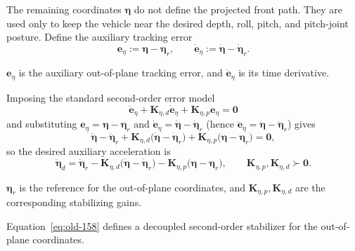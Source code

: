 \documentclass[12pt,a4paper]{report}
\newcommand{\newsymbols}[1]{\par\noindent{}#1\par\vspace{0.35em}}
\newcommand{\formulaannotation}[1]{\par\noindent{}#1\par\vspace{0.35em}}
\begin{document}
The remaining coordinates $\boldsymbol{\eta}$ do not define the projected front path. They are used only to keep the vehicle near the desired depth, roll, pitch, and pitch-joint posture. Define the auxiliary tracking error
\begin{equation}
\mathbf{e}_{\eta} := \boldsymbol{\eta} - \boldsymbol{\eta}_r,
\qquad
\dot{\mathbf{e}}_{\eta} := \dot{\boldsymbol{\eta}} - \dot{\boldsymbol{\eta}}_r.
\end{equation}
\newsymbols{$\mathbf{e}_{\eta}$ is the auxiliary out-of-plane tracking error, and $\dot{\mathbf{e}}_{\eta}$ is its time derivative.}
Imposing the standard second-order error model
\begin{equation}
\ddot{\mathbf{e}}_{\eta} + \mathbf{K}_{\eta,d}\dot{\mathbf{e}}_{\eta} + \mathbf{K}_{\eta,p}\mathbf{e}_{\eta} = \mathbf{0}
\end{equation}
and substituting $\mathbf{e}_{\eta} = \boldsymbol{\eta} - \boldsymbol{\eta}_r$ and $\dot{\mathbf{e}}_{\eta} = \dot{\boldsymbol{\eta}} - \dot{\boldsymbol{\eta}}_r$ (hence $\ddot{\mathbf{e}}_{\eta} = \ddot{\boldsymbol{\eta}} - \ddot{\boldsymbol{\eta}}_r$) gives
\begin{equation}
\ddot{\boldsymbol{\eta}} -
\ddot{\boldsymbol{\eta}}_r +
\mathbf{K}_{\eta,d}
\bigl(
\dot{\boldsymbol{\eta}} - \dot{\boldsymbol{\eta}}_r
\bigr)
+
\mathbf{K}_{\eta,p}
\bigl(
\boldsymbol{\eta} - \boldsymbol{\eta}_r
\bigr)
= \mathbf{0},
\end{equation}
so the desired auxiliary acceleration is
\begin{equation}
\ddot{\boldsymbol{\eta}}_d =
\ddot{\boldsymbol{\eta}}_r -
\mathbf{K}_{\eta,d}
\bigl(
\dot{\boldsymbol{\eta}} - \dot{\boldsymbol{\eta}}_r
\bigr)
-
\mathbf{K}_{\eta,p}
\bigl(
\boldsymbol{\eta} - \boldsymbol{\eta}_r
\bigr),
\qquad
\mathbf{K}_{\eta,p}, \mathbf{K}_{\eta,d} \succ \mathbf{0}.
\label{eq:old-158}
\end{equation}
\newsymbols{$\boldsymbol{\eta}_r$ is the reference for the out-of-plane coordinates, and $\mathbf{K}_{\eta,p},\mathbf{K}_{\eta,d}$ are the corresponding stabilizing gains.}
\formulaannotation{Equation~\eqref{eq:old-158} defines a decoupled second-order stabilizer for the out-of-plane coordinates.}
\end{document}

